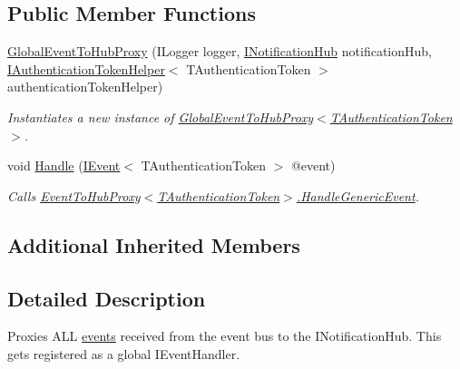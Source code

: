 \subsection*{Public Member Functions}
\begin{DoxyCompactItemize}
\item 
\hyperlink{classCqrs_1_1WebApi_1_1Events_1_1Handlers_1_1GlobalEventToHubProxy_a42cb05f70d5705bd182f42caf297a960_a42cb05f70d5705bd182f42caf297a960}{Global\+Event\+To\+Hub\+Proxy} (I\+Logger logger, \hyperlink{interfaceCqrs_1_1WebApi_1_1SignalR_1_1Hubs_1_1INotificationHub}{I\+Notification\+Hub} notification\+Hub, \hyperlink{interfaceCqrs_1_1Authentication_1_1IAuthenticationTokenHelper}{I\+Authentication\+Token\+Helper}$<$ T\+Authentication\+Token $>$ authentication\+Token\+Helper)
\begin{DoxyCompactList}\small\item\em Instantiates a new instance of \hyperlink{classCqrs_1_1WebApi_1_1Events_1_1Handlers_1_1GlobalEventToHubProxy_a42cb05f70d5705bd182f42caf297a960_a42cb05f70d5705bd182f42caf297a960}{Global\+Event\+To\+Hub\+Proxy$<$\+T\+Authentication\+Token$>$}. \end{DoxyCompactList}\item 
void \hyperlink{classCqrs_1_1WebApi_1_1Events_1_1Handlers_1_1GlobalEventToHubProxy_a80deae2ad156cccae069e9cf7b0cd6aa_a80deae2ad156cccae069e9cf7b0cd6aa}{Handle} (\hyperlink{interfaceCqrs_1_1Events_1_1IEvent}{I\+Event}$<$ T\+Authentication\+Token $>$ @event)
\begin{DoxyCompactList}\small\item\em Calls \hyperlink{classCqrs_1_1WebApi_1_1Events_1_1Handlers_1_1EventToHubProxy_a310fc8d40bfbe514406716150f30b74d_a310fc8d40bfbe514406716150f30b74d}{Event\+To\+Hub\+Proxy$<$\+T\+Authentication\+Token$>$.\+Handle\+Generic\+Event}. \end{DoxyCompactList}\end{DoxyCompactItemize}
\subsection*{Additional Inherited Members}


\subsection{Detailed Description}
Proxies A\+LL \hyperlink{}{events} received from the event bus to the I\+Notification\+Hub. This gets registered as a global I\+Event\+Handler. 


